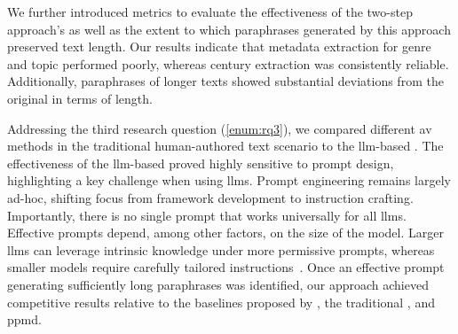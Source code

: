We further introduced metrics to evaluate the effectiveness of the two-step approach’s \pextractor{} as well as the extent to which paraphrases generated by this approach preserved text length.
Our results indicate that metadata extraction for genre and topic performed poorly, whereas century extraction was consistently reliable. 
Additionally, paraphrases of longer \dataGutenberg{} texts showed substantial deviations from the original in terms of length.

Addressing the third research question (\ref{enum:rq3}), we compared different \ac{av} methods in the traditional human-authored text scenario 
to the \ac{llm}-based \impAppr{}.
The effectiveness of the \ac{llm}-based \impAppr{} proved highly sensitive to prompt design, highlighting a key challenge when using \acp{llm}. 
Prompt engineering remains largely ad-hoc, shifting focus from framework development to instruction crafting. 
Importantly, there is no single prompt that works universally for all \acp{llm}. 
Effective prompts depend, among other factors, on the size of the model. 
Larger \acp{llm} can leverage intrinsic knowledge under more permissive prompts, whereas smaller models require carefully tailored instructions~\citep{schmidt_llm_av_latin_24}.
Once an effective prompt generating sufficiently long paraphrases was identified, our approach achieved competitive results relative to the baselines proposed by \citet{koppel_determining_2014}, the traditional \impAppr{}, \unmasking{} and \ac{ppmd}.

